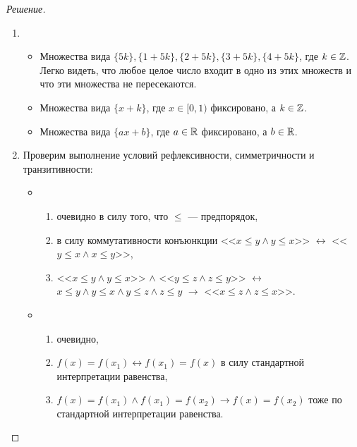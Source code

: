     \begin{proof}[Решение]
        \begin{enumerate}[label=(\alph{*})]
            \item \begin{itemize}
                \item Множества вида \(\{5k\}, \{1 + 5k\}, \{2 + 5k\}, \{3 + 5k\}, \{4 + 5k\}\), где \(k \in \mathbb{Z}\). Легко видеть, что любое целое число входит в одно из этих множеств и что эти множества не пересекаются.
                \item Множества вида \(\{x + k\}\), где \(x \in [0, 1)\) фиксировано, а \(k \in \mathbb{Z}\).
                \item Множества вида \(\{ax + b\}\), где \(a \in \mathbb{R}\) фиксировано, а \(b \in \mathbb{R}\).
            \end{itemize}
            \item Проверим выполнение условий рефлексивности, симметричности и транзитивности:
            \begin{itemize}
                \item \begin{enumerate}[label=\arabic{*})]
                    \item очевидно в силу того, что \(\leqslant\) --- предпорядок,
                    \item в силу коммутативности конъюнкции <<\(x \leqslant y \land y \leqslant x\)>> \(\leftrightarrow\) <<\(y \leqslant x \land x \leqslant y\)>>,
                    \item <<\(x \leqslant y \land y \leqslant x\)>> \(\land\) <<\(y \leqslant z \land z \leqslant y\)>> \(\leftrightarrow\) \(x \leqslant y \land y \leqslant x \land y \leqslant z \land z \leqslant y\) \(\to\) <<\(x \leqslant z \land z \leqslant x\)>>.
                \end{enumerate}
                \item \begin{enumerate}[label=\arabic{*})]
                    \item очевидно,
                    \item \(f(x) = f(x_1) \leftrightarrow f(x_1) = f(x)\) в силу стандартной интерпретации равенства,
                    \item \(f(x) = f(x_1) \land f(x_1) = f(x_2) \to f(x) = f(x_2)\) тоже по стандартной интерпретации равенства.
                \end{enumerate}
            \end{itemize}
        \end{enumerate}
    \end{proof}
